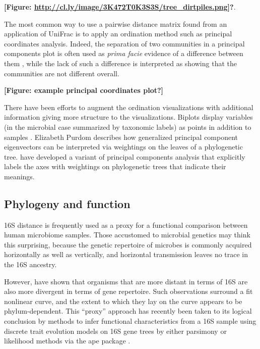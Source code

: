 \documentclass{amsart}
\begin{document}
\textbf{[Figure: \url{http://cl.ly/image/3K472T0K3S3S/tree_dirtpiles.png}]?}.

The most common way to use a pairwise distance matrix found from an application of UniFrac is to apply an ordination method such as principal coordinates analysis.
Indeed, the separation of two communities in a principal components plot is often used as \emph{prima facie} evidence of a difference between them
\citep[e.g.][]{lozupone2007global,costello2009bacterial,yatsunenko2012human}, while the lack of such a difference is interpreted as showing that the communities are not different overall.

\textbf{[Figure: example principal coordinates plot?]}

There have been efforts to augment the ordination visualizations with additional information giving more structure to the visualizations.
Biplots display variables (in the microbial case summarized by taxonomic labels) as points in addition to samples \citep[e.g.][]{hewitt2013bacterial,lozupone2013meta}.
Elizabeth Purdom \citep{BikEaMicrobiotaStomach06,PurdomAnalyzingDataGraphs08} describes how generalized principal component eigenvectors can be interpreted via weightings on the leaves of a phylogenetic tree.
\citet{matsen2013edge} have developed a variant of principal components analysis that explicitly labels the axes with weightings on phylogenetic trees that indicate their meanings.


\subsection{Phylogeny and function}

16S distance is frequently used as a proxy for a functional comparison between human microbiome samples.
Those accustomed to microbial genetics may think this surprising, because the genetic repertoire of microbes is commonly acquired horizontally as well as vertically, and horizontal transmission leaves no trace in the 16S ancestry.

However, \citet{zaneveld2010ribosomal} have shown that organisms that are more distant in terms of 16S are also more divergent in terms of gene repertoire.
Such observations surround a fit nonlinear curve, and the extent to which they lay on the curve appears to be phylum-dependent.
This ``proxy'' approach has recently been taken to its logical conclusion by methods to infer functional characteristics from a 16S sample using discrete trait evolution models on 16S gene trees \citep{langille2013predictive} by either parsimony \citep{kluge1969quantitative} or likelihood \citep{pagel1994detecting} methods via the ape package \citep{paradis2004ape}.
\end{document}
